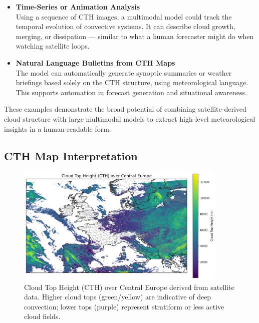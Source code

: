 \begin{itemize}
    \item \textbf{Time-Series or Animation Analysis} \\
    Using a sequence of CTH images, a multimodal model could track the temporal evolution of convective systems. It can describe cloud growth, merging, or dissipation — similar to what a human forecaster might do when watching satellite loops.

    \item \textbf{Natural Language Bulletins from CTH Maps} \\
    The model can automatically generate synoptic summaries or weather briefings based solely on the CTH structure, using meteorological language. This supports automation in forecast generation and situational awareness.

\end{itemize}

These examples demonstrate the broad potential of combining satellite-derived cloud structure with large multimodal models to extract high-level meteorological insights in a human-readable form.


%
\subsection{CTH Map Interpretation}

\begin{figure}[h]
  \centering
  \includegraphics[width=0.9\textwidth]{images/cth_map.png}
  \caption{Cloud Top Height (CTH) over Central Europe derived from satellite data. Higher cloud tops (green/yellow) are indicative of deep convection; lower tops (purple) represent stratiform or less active cloud fields.}
\end{figure}

